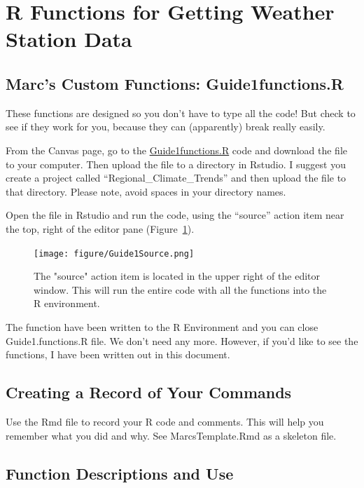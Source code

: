 \documentclass{article}\usepackage[]{graphicx}\usepackage[dvipsnames]{xcolor}
\begin{document}
\section{R Functions for Getting Weather Station Data}

\subsection{Marc's Custom Functions: Guide1functions.R}



These functions are designed so you don't have to type all the code! But check to see if they work for you, because they can (apparently) break really easily. 

From the Canvas page, go to the \href{https://github.com/marclos/RTricks/blob/master/04_Regional_Climate_Trends/Guides/Guide1functions.R}{Guide1functions.R} code and download the file to your computer. Then upload the file to a directory in Rstudio. I suggest you create a project called ``Regional\_Climate\_Trends'' and then upload the file to that directory. Please note, avoid spaces in your directory names.

Open the file in Rstudio and run the code, using the ``source'' action item near the top, right of the editor pane (Figure~\ref{fig:source_code}).

\begin{figure}[h]
\centering
\texttt{[image: figure/Guide1Source.png]}
\caption{The "source" action item is located in the upper right of the editor window. This will run the entire code with all the functions into the R environment.}
\label{fig:source_code}
\end{figure}

The function have been written to the R Environment and you can close Guide1.functions.R file. We don't need any more. However, if you'd like to see the functions, I have been written out in this document. 

\subsection{Creating a Record of Your Commands}

Use the Rmd file to record your R code and comments. This will help you remember what you did and why. See MarcsTemplate.Rmd as a skeleton file. 

\subsection{Function Descriptions and Use}
\end{document}
